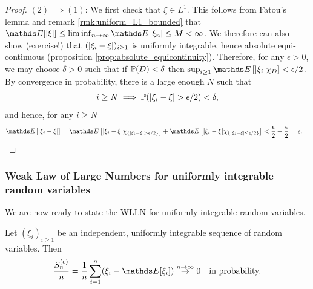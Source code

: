 \begin{unexaminable}
\begin{proof}
$(2) \implies (1)$: We first check that $\xi \in L^1$. This follows from Fatou's lemma and remark \ref{rmk:uniform_L1_bounded} that $\E[\abs{\xi}] \leq \liminf_{n\to\infty} \E\abs{\xi_n} \leq M < \infty$. We therefore can also show (exercise!) that $(\left| \xi_i - \xi \right|)_{i\geq 1}$ is uniformly integrable, hence absolute equi-continuous (proposition \ref{prop:absolute_equicontinuity}). Therefore, for any $\epsilon > 0$, we may choose $\delta > 0$ such that if $\mathbb{P}(D)<\delta$ then $\sup_{i\geq 1} \E\sqbracket{|\xi_i|\chi_D} < \epsilon/2$. By convergence in probability, there is a large enough $N$ such that
\begin{equation}
    i \geq N \implies \mathbb{P}(|\xi_i - \xi| > \epsilon/2) < \delta,
\end{equation}
and hence, for any $i \geq N$
\begin{align}
    \E\sqbracket{|\xi_i - \xi|} &= \E\sqbracket{|\xi_i - \xi| \chi_{\set{|\xi_i - \xi|>\epsilon/2}}} + \E\sqbracket{|\xi_i - \xi| \chi_{\set{|\xi_i - \xi|\leq \epsilon/2}}} < \frac{\epsilon}{2} + \frac{\epsilon}{2} = \epsilon.
\end{align}
\end{proof}

\subsubsection{Weak Law of Large Numbers for uniformly integrable random variables}
We are now ready to state the WLLN for uniformly integrable random variables.
\begin{theorem} Let $(\xi_i)_{i\geq 1}$ be an independent, uniformly integrable sequence of random variables. Then 
\begin{equation*}
\frac{S_n^{(c)}}{n} = \frac{1}{n} \sum_{i=1}^n (\xi_i - \E[\xi_i]) \overset{n\to\infty}\to 0 \quad \text{in probability.}
\end{equation*}
\end{theorem}


\end{unexaminable}
